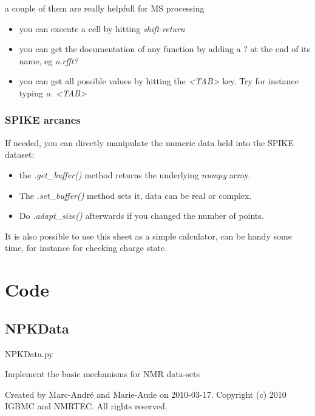 \documentclass[letterpaper,10pt,openany,oneside]{sphinxmanual}
\begin{document}
a couple of them are really helpfull for MS processing
\begin{itemize}
\item {} 
you can execute a cell by hitting \emph{shift-return}

\item {} 
you can get the documentation of any function by adding a ? at the end of its name, eg \emph{o.rfft?}

\item {} 
you can get all possible values by hitting the \emph{\textless{}TAB\textgreater{}} key. Try for instance typing \emph{o. \textless{}TAB\textgreater{}}

\end{itemize}


\subsection{SPIKE arcanes}
\label{rst/tutorial:spike-arcanes}
If needed, you can directly manipulate the numeric data held into the SPIKE dataset:
\begin{itemize}
\item {} 
the \emph{.get\_buffer()} method returns the underlying \emph{numpy} array.

\item {} 
The \emph{.set\_buffer()} method sets it, data can be real or complex.

\item {} 
Do \emph{.adapt\_size()} afterwards if you changed the number of points.

\end{itemize}

It is also possible to use this sheet as a simple calculator, can be handy some time, for instance for checking charge state.


\chapter{Code}
\label{rst/code:code}\label{rst/code::doc}

\section{NPKData}
\label{rst/code:npkdata}\label{rst/code:module-NPKData}
NPKData.py

Implement the basic mechanisms for NMR data-sets

Created by Marc-André and Marie-Aude on 2010-03-17.
Copyright (c) 2010 IGBMC and NMRTEC. All rights reserved.
\end{document}
